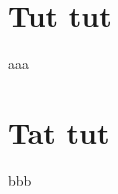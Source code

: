 \documentclass{article}
\begin{document}
\section{Tut tut}
aaa


\section{Tat tut}
bbb
\end{document}
